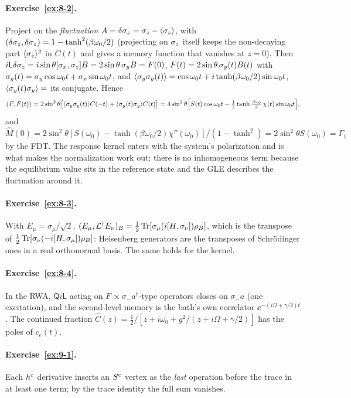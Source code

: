 \paragraph{Exercise~\ref{ex:8-2}.}
Project on the \emph{fluctuation} $A=\delta\sigma_z=\sigma_z-\langle\sigma_z\rangle$, with $(\delta\sigma_z,\delta\sigma_z)=1-\tanh^2(\beta\omega_0/2)$ (projecting on $\sigma_z$ itself keeps the non-decaying part $\langle\sigma_z\rangle^2$ in $C(t)$ and gives a memory function that vanishes at $z=0$).
Then $i\mathsf L\delta\sigma_z=i\sin\theta[\sigma_x,\sigma_z]B=2\sin\theta\,\sigma_y B=F(0)$, $F(t)=2\sin\theta\,\sigma_y(t)B(t)$ with $\sigma_y(t)=\sigma_y\cos\omega_0t+\sigma_x\sin\omega_0t$, and $\langle\sigma_y\sigma_y(t)\rangle=\cos\omega_0t+i\tanh(\beta\omega_0/2)\sin\omega_0t$, $\langle\sigma_y(t)\sigma_y\rangle=$ its conjugate.
Hence
\begin{equation*}
  (F,F(t))=2\sin^2\theta\big[\langle\sigma_y\sigma_y(t)\rangle C(-t)+\langle\sigma_y(t)\sigma_y\rangle C(t)\big]
  =4\sin^2\theta\Big[S(t)\cos\omega_0t-\tfrac12\tanh\tfrac{\beta\omega_0}{2}\,\chi(t)\sin\omega_0t\Big],
\end{equation*}
and $\hat M(0)=2\sin^2\theta[S(\omega_0)-\tanh(\beta\omega_0/2)\chi''(\omega_0)]/(1-\tanh^2)=2\sin^2\theta S(\omega_0)=\Gamma_1$ by the FDT.
The response kernel enters with the system's polarization and is what makes the normalization work out; there is no inhomogeneous term because the equilibrium value sits in the reference state and the GLE describes the fluctuation around it.

\paragraph{Exercise~\ref{ex:8-3}.}
With $E_\mu=\sigma_\mu/\sqrt2$, $(E_\mu,\mathcal{L}^\dagger E_\nu)_B=\tfrac12\operatorname{Tr}[\sigma_\mu(i[H,\sigma_\nu])\rho_{B}]$, which is the transpose of $\tfrac12\operatorname{Tr}[\sigma_\nu(-i[H,\sigma_\mu])\rho_{B}]$: Heisenberg generators are the transposes of Schr\"odinger ones in a real orthonormal basis.
The same holds for the kernel.

\paragraph{Exercise~\ref{ex:8-4}.}
In the RWA, $\mathsf Q i\mathsf L$ acting on $F\propto\sigma_-a^\dagger$-type operators closes on $\sigma_-a$ (one excitation), and the second-level memory is the bath's own correlator $\ee^{-(i\Omega+\gamma/2)t}$.
The continued fraction $\hat C(z)=\tfrac12/[z+i\omega_0+g^2/(z+i\Omega+\gamma/2)]$ has the poles of $c_e(t)$.

\paragraph{Exercise~\ref{ex:9-1}.}
Each $h^{\mathrm{c}}$ derivative inserts an $S^{\mathrm{c}}$ vertex as the \emph{last} operation before the trace in at least one term; by the trace identity the full sum vanishes.


